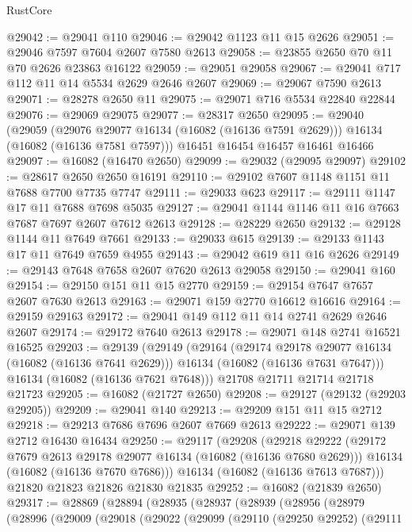 \begin{lexlean}{RustCore}
\begin{coremodule}
@29042 := @29041 @110
@29046 := @29042 @1123 @11 @15 @2626
@29051 := @29046 @7597 @7604 @2607 @7580 @2613
@29058 := @23855 @2650 @70 @11 @70 @2626 @23863 @16122
@29059 := @29051 @29058
@29067 := @29041 @717 @112 @11 @14 @5534 @2629 @2646 @2607
@29069 := @29067 @7590 @2613
@29071 := @28278 @2650 @11
@29075 := @29071 @716 @5534 @22840 @22844
@29076 := @29069 @29075
@29077 := @28317 @2650
@29095 := @29040
    (@29059
      (@29076 @29077 @16134 (@16082 (@16136 @7591 @2629)))
      @16134
      (@16082 (@16136 @7581 @7597)))
    @16451
    @16454
    @16457
    @16461
    @16466
@29097 := @16082 (@16470 @2650)
@29099 := @29032 (@29095 @29097)
@29102 := @28617 @2650 @2650 @16191
@29110 := @29102 @7607 @1148 @1151 @11 @7688 @7700 @7735 @7747
@29111 := @29033 @623
@29117 := @29111 @1147 @17 @11 @7688 @7698 @5035
@29127 := @29041 @1144 @1146 @11 @16 @7663 @7687 @7697 @2607 @7612 @2613
@29128 := @28229 @2650
@29132 := @29128 @1144 @11 @7649 @7661
@29133 := @29033 @615
@29139 := @29133 @1143 @17 @11 @7649 @7659 @4955
@29143 := @29042 @619 @11 @16 @2626
@29149 := @29143 @7648 @7658 @2607 @7620 @2613 @29058
@29150 := @29041 @160
@29154 := @29150 @151 @11 @15 @2770
@29159 := @29154 @7647 @7657 @2607 @7630 @2613
@29163 := @29071 @159 @2770 @16612 @16616
@29164 := @29159 @29163
@29172 := @29041 @149 @112 @11 @14 @2741 @2629 @2646 @2607
@29174 := @29172 @7640 @2613
@29178 := @29071 @148 @2741 @16521 @16525
@29203 := @29139
    (@29149
      (@29164
        (@29174 @29178 @29077 @16134 (@16082 (@16136 @7641 @2629)))
        @16134
        (@16082 (@16136 @7631 @7647)))
      @16134
      (@16082 (@16136 @7621 @7648)))
    @21708
    @21711
    @21714
    @21718
    @21723
@29205 := @16082 (@21727 @2650)
@29208 := @29127 (@29132 (@29203 @29205))
@29209 := @29041 @140
@29213 := @29209 @151 @11 @15 @2712
@29218 := @29213 @7686 @7696 @2607 @7669 @2613
@29222 := @29071 @139 @2712 @16430 @16434
@29250 := @29117
    (@29208
      (@29218
        @29222
        (@29172 @7679 @2613 @29178 @29077 @16134 (@16082 (@16136 @7680 @2629)))
        @16134
        (@16082 (@16136 @7670 @7686)))
      @16134
      (@16082 (@16136 @7613 @7687)))
    @21820
    @21823
    @21826
    @21830
    @21835
@29252 := @16082 (@21839 @2650)
@29317 := @28869
    (@28894
      (@28935
        (@28937
          (@28939
            (@28956
              (@28979
                (@28996
                  (@29009
                    (@29018
                      (@29022
                        (@29099
                          (@29110
                            (@29250 @29252)
                            (@29111

\end{coremodule}
\end{lexlean}
